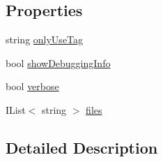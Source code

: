 \subsection*{Properties}
\begin{DoxyCompactItemize}
\item 
string \hyperlink{a00085_a8b30c1b7fb1b74eae455a568c1024b3d}{only\-Use\-Tag}
\item 
bool \hyperlink{a00022_a89964ea17bd19caf00cb5bff563ed01c}{show\-Debugging\-Info}
\item 
bool \hyperlink{a00022_ada4d83d1756918f362d55f6649b82b17}{verbose}
\item 
I\-List$<$ string $>$ \hyperlink{a00022_aa93cbb1bc1d5328e0a417012621e92d2}{files}
\end{DoxyCompactItemize}


\subsection{Detailed Description}


